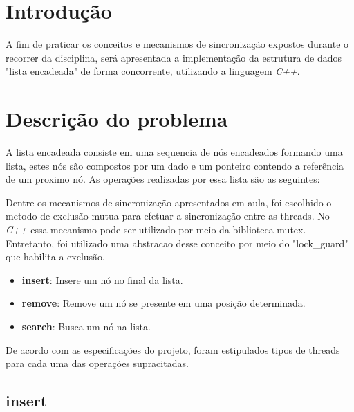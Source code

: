 \documentclass[
	article,			%
	11pt,				%
	oneside,			%
	a4paper,			%
	english,			%
	brazil,				%
	sumario=tradicional
	]{abntex2}
\begin{document}
\frenchspacing

\maketitle


\section*{Introdução}

A fim de praticar os conceitos e mecanismos de sincronização expostos
durante o recorrer da disciplina, será apresentada a implementação da
estrutura de dados "lista encadeada" de forma concorrente, utilizando a
linguagem \textit{C++}.

\section*{Descrição do problema}

A lista encadeada consiste em uma sequencia de nós encadeados formando
uma lista, estes nós são compostos por um dado e um ponteiro contendo a
referência de um proximo nó. As operações realizadas por essa lista são
as seguintes:

Dentre os mecanismos de sincronização apresentados em aula, foi escolhido o
metodo de exclusão mutua para efetuar a sincronização entre as threads. No
\textit{C++} essa mecanismo pode ser utilizado por meio da biblioteca
mutex. Entretanto, foi utilizado uma abstracao desse conceito por meio
do "lock\_guard" que habilita a exclusão.

\begin{itemize}
  \item{\textbf{insert}}: Insere um nó no final da lista.

  \item{\textbf{remove}}: Remove um nó se presente em uma posição determinada.

  \item{\textbf{search}}: Busca um nó na lista.
\end{itemize}

De acordo com as especificações do projeto, foram estipulados tipos de
threads para cada uma das operações supracitadas.

\subsection{insert}
\end{document}
